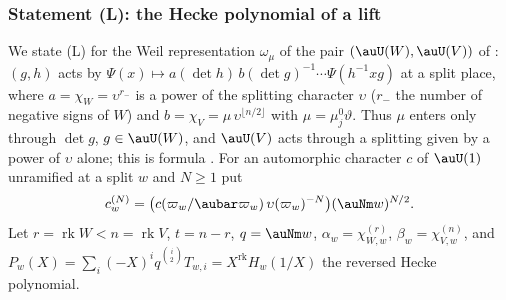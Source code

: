 \documentclass[10pt]{amsart}
\theoremstyle{definition}
\theoremstyle{remark}
\begin{document}
\subsubsection{Statement (L): the Hecke polynomial of a lift}\label{pga:ss-L}

We state (L) for the Weil representation $\omega_\mu$ of the pair $(\auU(W),\auU(V))$ of
{\cite[\S2.1]{P54}}: $(g,h)$ acts by
$\Psi(x)\mapsto a(\det h)\,b(\det g)^{-1}\cdots\Psi(h^{-1}xg)$ at a split place, where
$a=\chi_W=\upsilon^{r_-}$ is a power of the splitting character $\upsilon$ ($r_-$ the number of
negative signs of $W$) and $b=\chi_V=\mu\,\upsilon^{\lfloor n/2\rfloor}$ with $\mu=\mu^0_j\vartheta$.
Thus $\mu$ enters only through $\det g$, $g\in\auU(W)$, and $\auU(V)$ acts through a splitting
given by a power of $\upsilon$ alone; this is formula {\cite[(1)]{P54}}. For an
automorphic character $c$ of $\auU(1)$ unramified at a split $w$ and $N\ge1$ put
\[
c^{(N)}_w=\bigl(c(\varpi_w/\aubar\varpi_w)\,\upsilon(\varpi_w)^{-N}\bigr)(\auNm w)^{N/2}
.
\]
Let $r=\operatorname{rk}W<n=\operatorname{rk}V$, $t=n-r$, $q=\auNm w$, $\alpha_w=\chi_{W,w}^{(r)}$,
$\beta_w=\chi_{V,w}^{(n)}$, and $P_w(X)=\sum_i(-X)^iq^{\binom i2}T_{w,i}=X^{\operatorname{rk}}
H_w(1/X)$ the reversed Hecke polynomial.
\end{document}
